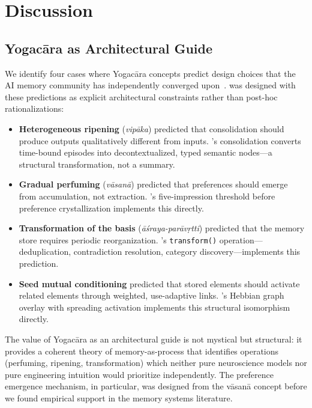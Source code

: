 \section{Discussion}
\label{sec:discussion}

\subsection{Yogac\=ara as Architectural Guide}

We identify four cases where Yogac\=ara concepts predict design choices
that the AI memory community has independently converged
upon~\cite{hui2026taxonomy}. \alaya{} was designed with these predictions
as explicit architectural constraints rather than post-hoc rationalizations:

\begin{itemize}[nosep]
    \item \textbf{Heterogeneous ripening} (\emph{vip\=aka}) predicted that
    consolidation should produce outputs qualitatively different from inputs.
    \alaya{}'s consolidation converts time-bound episodes into
    decontextualized, typed semantic nodes---a structural transformation,
    not a summary.
    \item \textbf{Gradual perfuming} (\emph{v\=asan\=a}) predicted that
    preferences should emerge from accumulation, not extraction. \alaya{}'s
    five-impression threshold before preference crystallization implements
    this directly.
    \item \textbf{Transformation of the basis}
    (\emph{\=a\'sraya-par\=av\d{r}tti}) predicted that the memory store
    requires periodic reorganization. \alaya{}'s \texttt{transform()}
    operation---deduplication, contradiction resolution, category
    discovery---implements this prediction.
    \item \textbf{Seed mutual conditioning} predicted that stored elements
    should activate related elements through weighted, use-adaptive links.
    \alaya{}'s Hebbian graph overlay with spreading activation implements
    this structural isomorphism directly.
\end{itemize}

The value of Yogac\=ara as an architectural guide is not mystical but
structural: it provides a coherent theory of memory-as-process that
identifies operations (perfuming, ripening, transformation) which neither
pure neuroscience models nor pure engineering intuition would prioritize
independently. The preference emergence mechanism, in particular, was
designed from the v\=asan\=a concept before we found empirical support in
the memory systems literature.

